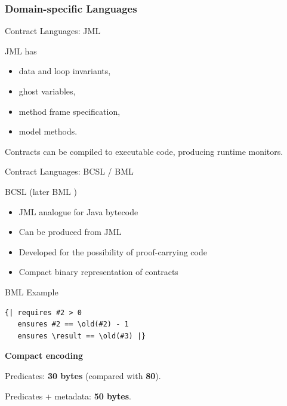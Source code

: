 \documentclass[12pt]{beamer}
\begin{document}
\subsubsection{Domain-specific Languages}
\label{sec:runver-dbc-dsl}

\begin{frame}[fragile]{Contract Languages: \small JML}

  JML \parencite{jml} has

  \begin{itemize}
    \item data and loop invariants,
    \item ghost variables,
    \item method frame specification,
    \item model methods.
  \end{itemize}

  Contracts can be compiled to executable code, producing runtime
  monitors.
\end{frame}


\begin{frame}{Contract Languages: \small BCSL / BML}

  BCSL \parencite{bcsl} (later BML \parencite{bml})

  \begin{itemize}
    \item JML analogue for Java bytecode
    \item Can be produced from JML
    \item Developed for the possibility of proof-carrying code
    \item Compact binary representation of contracts
  \end{itemize}
\end{frame}

\begin{frame}[fragile]{BML Example}
  \begin{verbatim}
{| requires #2 > 0
   ensures #2 == \old(#2) - 1
   ensures \result == \old(#3) |}
  \end{verbatim}

  \textbf{\large Compact encoding}\smallskip

  Predicates: \textbf{30 bytes} (compared with \textbf{80}).

  \vspace{0.25cm}

  Predicates + metadata: \textbf{50 bytes}.
\end{frame}
\end{document}
